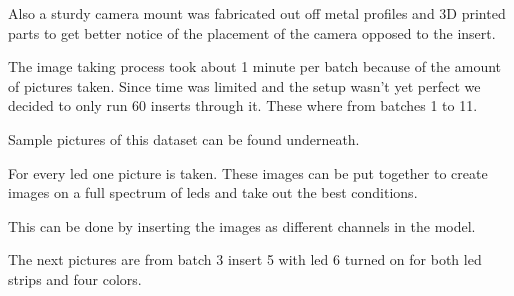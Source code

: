 \documentclass{scrartcl}
\begin{document}
Also a sturdy camera mount was fabricated out off metal profiles and 3D printed parts to get better notice of the placement of the camera opposed to the insert. 

The image taking process took about 1 minute per batch because of the amount of pictures taken. Since time was limited and the setup wasn't yet perfect we decided to only run 60 inserts through it. These where from batches 1 to 11. 

Sample pictures of this dataset can be found underneath. 

For every led one picture is taken. These images can be put together to create images on a full spectrum of leds and take out the best conditions. 

This can be done by inserting the images as different channels in the model.



The next pictures are from batch 3 insert 5 with led 6 turned on for both led strips and four colors.
\end{document}
